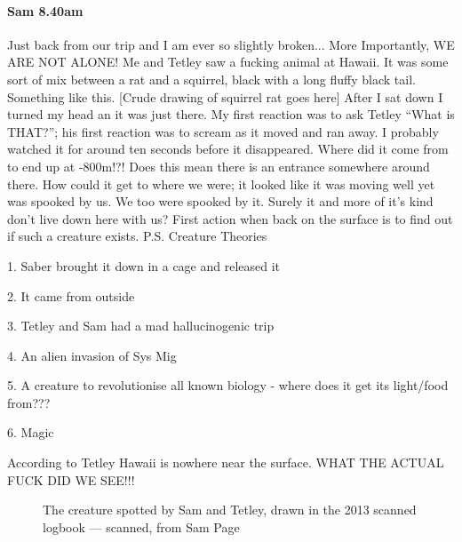 \paragraph{Sam 8.40am}
Just back from our trip and I am ever so slightly broken...
More Importantly, WE ARE NOT ALONE! Me and Tetley saw a fucking animal at Hawaii. It was some sort of mix between a rat and a squirrel, black with a long fluffy black tail. Something like this. 
[Crude drawing of squirrel rat goes here]
After I sat down I turned my head an it was just there. My first reaction was to ask Tetley “What is THAT?”; his first reaction was to scream as it moved and ran away. I probably watched it for around ten seconds before it disappeared. Where did it come from to end up at -800m!?! Does this mean there is an entrance somewhere around there. How could it get to where we were; it looked like it was moving well yet was spooked by us. We too were spooked by it. Surely it and more of it’s kind don’t live down here with us? First action when back on the surface is to find out if such a creature exists.
P.S. Creature Theories
\begin{citemize}
\item 1. Saber brought it down in a cage and released it
\item 2. It came from outside
\item 3. Tetley and Sam had a mad hallucinogenic trip
\item 4. An alien invasion of Sys Mig
\item 5. A creature to revolutionise all known biology - where does it get its light/food from???
\item 6. Magic
\end{citemize}
According to Tetley Hawaii is nowhere near the surface. WHAT THE ACTUAL FUCK DID WE SEE!!!

\begin{figure}[t!]
	\checkoddpage \ifoddpage \forcerectofloat \else \forceversofloat \fi
	\centering
	\caption{The creature spotted by Sam and Tetley, drawn in the 2013 scanned logbook --- scanned, from Sam Page}
	\label{the creature}
\end{figure}

